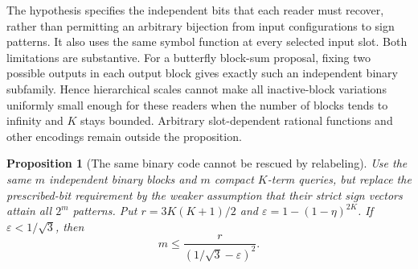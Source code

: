 \documentclass[11pt]{article}
\newtheorem{proposition}{Proposition}
\begin{document}
The hypothesis specifies the independent bits that each reader must
recover, rather than permitting an arbitrary bijection from input
configurations to sign patterns. It also uses the same symbol function
at every selected input slot. Both limitations are substantive.
For a butterfly block-sum proposal, fixing two possible outputs in each
output block gives exactly such an independent binary subfamily. Hence
hierarchical scales cannot make all inactive-block variations uniformly
small enough for these readers when the number of blocks tends to
infinity and $K$ stays bounded. Arbitrary slot-dependent rational
functions and other encodings remain outside the proposition.

\begin{proposition}[The same binary code cannot be rescued by relabeling]
Use the same $m$ independent binary blocks and $m$ compact $K$-term
queries, but replace the prescribed-bit requirement by the weaker
assumption that their strict sign vectors attain all $2^m$ patterns.
Put $r=3K(K+1)/2$ and $\varepsilon=1-(1-\eta)^{2K}$.
If $\varepsilon<1/\sqrt3$, then
\[
 m\leq \frac{r}{(1/\sqrt3-\varepsilon)^2}.
\]
\end{proposition}
\end{document}
